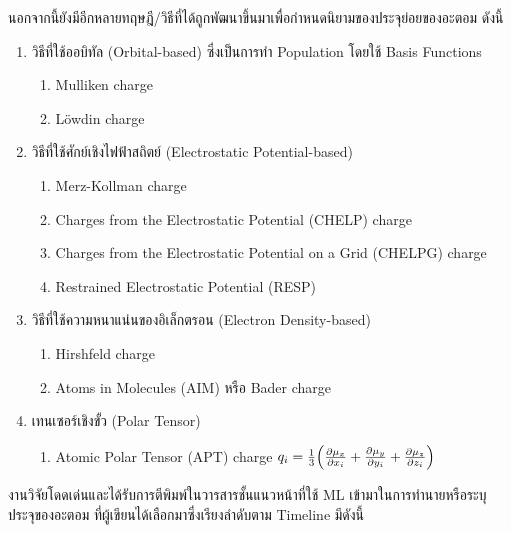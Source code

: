นอกจากนี้ยังมีอีกหลายทฤษฎี/วิธีที่ได้ถูกพัฒนาขึ้นมาเพื่อกำหนดนิยามของประจุย่อยของอะตอม ดังนี้

\begin{enumerate}
    \item วิธีที่ใช้ออบิทัล (Orbital-based) ซึ่งเป็นการทำ Population โดยใช้ Basis Functions
        \begin{enumerate}
            \item Mulliken charge\autocite{szabo1996}
            \item L\"{o}wdin charge\autocite{lowdin1950}
        \end{enumerate}
    \item วิธีที่ใช้ศักย์เชิงไฟฟ้าสถิตย์ (Electrostatic Potential-based)
        \begin{enumerate}
            \item Merz-Kollman charge\autocite{singh1984}
            \item Charges from the Electrostatic Potential (CHELP) charge\autocite{chirlian1987}
            \item Charges from the Electrostatic Potential on a Grid (CHELPG) charge\autocite{breneman1990}
            \item Restrained Electrostatic Potential (RESP)\autocite{cornell1993}
        \end{enumerate}
    \item วิธีที่ใช้ความหนาแน่นของอิเล็กตรอน (Electron Density-based)
    \begin{enumerate}
        \item Hirshfeld charge\autocite{hirshfeld1977}
        \item Atoms in Molecules (AIM) หรือ Bader charge\autocite{bader1985,bader1991}
    \end{enumerate}
    \item เทนเซอร์เชิงขั้ว (Polar Tensor)\autocite{person1974,milani2010}
        \begin{enumerate}
        \item Atomic Polar Tensor (APT) charge $q_{i} = \frac{1}{3}\Big(\pdv{\mu_{x}}{x_{i}} + \pdv{\mu_{y}}{y_{i}} + \pdv{\mu_{z}}{z_{i}}\Big)$
        \end{enumerate}
\end{enumerate}

งานวิจัยโดดเด่นและได้รับการตีพิมพ์ในวารสารชั้นแนวหน้าที่ใช้ ML เข้ามาในการทำนายหรือระบุประจุของอะตอม ที่ผู้เขียนได้เลือกมาซึ่งเรียงลำดับตาม 
Timeline มีดังนี้

